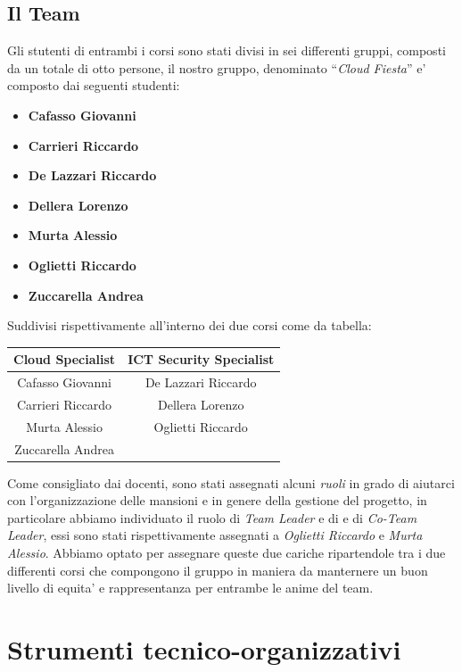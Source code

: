 \documentclass[a4paper]{report}
\newcommand{\quotes}[1]{``#1''}
\begin{document}
	\section{Il Team}\label{il_team}
		Gli stutenti di entrambi i corsi sono stati divisi in sei differenti gruppi, composti da un totale di otto persone,
		il nostro gruppo, denominato \quotes{\emph{Cloud Fiesta}} e' composto dai seguenti studenti:
		\begin{itemize}
			\item \textbf{Cafasso Giovanni}
			\item \textbf{Carrieri Riccardo}
			\item \textbf{De Lazzari Riccardo}
			\item \textbf{Dellera Lorenzo}
			\item \textbf{Murta Alessio}
			\item \textbf{Oglietti Riccardo}
			\item \textbf{Zuccarella Andrea}
		\end{itemize}
		Suddivisi rispettivamente all'interno dei due corsi come da tabella:
		\begin{center}
			\begin{tabular}{c c}
				Cloud Specialist & ICT Security Specialist \\
				\midrule
				Cafasso Giovanni & De Lazzari Riccardo \\
				Carrieri Riccardo & Dellera Lorenzo \\
				Murta Alessio & Oglietti Riccardo \\
				Zuccarella Andrea & \\
			\end{tabular}
		\end{center}
		Come consigliato dai docenti, sono stati assegnati alcuni \emph{ruoli} in grado di aiutarci con l'organizzazione
		delle mansioni e in genere della gestione del progetto, in particolare abbiamo individuato il ruolo di
		\emph{Team Leader} e di e di \emph{Co-Team Leader}, essi sono stati rispettivamente assegnati a \emph{Oglietti
		Riccardo} e \emph{Murta Alessio}. Abbiamo optato per assegnare queste due cariche ripartendole tra i due
		differenti corsi che compongono il gruppo in maniera da manternere un buon livello di equita' e rappresentanza
		per entrambe le anime del team.

\chapter{Strumenti tecnico-organizzativi}
\end{document}
